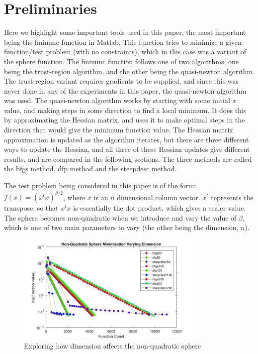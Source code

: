 \documentclass[sigconf, 7pt]{acmart}
\begin{document}
\section{Preliminaries}
\label{sec:pre}
Here we highlight some important tools used in this paper, the most important being the fminunc function in Matlab. This function tries to minimize a given function/test problem (with no constraints), which in this case was a variant of the sphere function. The fminunc function follows one of two algorithms, one being the trust-region algorithm, and the other being the quasi-newton algorithm. The trust-region variant requires gradients to be supplied, and since this was never done in any of the experiments in this paper, the quasi-newton algorithm was used. The quasi-newton algorithm works by starting with some initial $x$ value, and making steps in some direction to find a local minimum. It does this by approximating the Hessian matrix, and uses it to make optimal steps in the direction that would give the minimum function value. The Hessian matrix approximation is updated as the algorithm iterates, but there are three different ways to update the Hessian, and all three of these Hessian updates give different results, and are compared in the following sections. The three methods are called the bfgs method, dfp method and the steepdesc method.

The test problem being considered in this paper is of the form: $f(x)=(x^tx)^{\beta/2}$, where $x$ is an $n$ dimensional column vector. $x^t$ represents the transpose, so that $x^tx$ is essentially the dot product, which gives a scaler value. The sphere becomes non-quadratic when we introduce and vary the value of $\beta$, which is one of two main parameters to vary (the other being the dimension, $n$).

\begin{figure}
\centering
  \includegraphics[width=9cm]{SphereDimenExploration1.jpg}
  \caption{Exploring how dimension affects the non-quadratic sphere}
  \label{fig:sdimen}
\end{figure}
\end{document}
